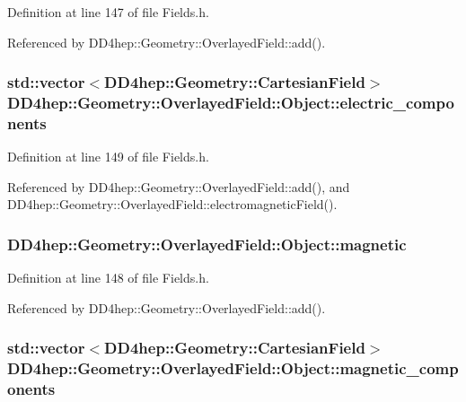Definition at line 147 of file Fields.h.

Referenced by DD4hep::Geometry::OverlayedField::add().\hypertarget{class_d_d4hep_1_1_geometry_1_1_overlayed_field_1_1_object_aae39088c562716b2948e205cebb2c8b4}{
\subsubsection[{electric\_\-components}]{\setlength{\rightskip}{0pt plus 5cm}std::vector$<${\bf DD4hep::Geometry::CartesianField}$>$ {\bf DD4hep::Geometry::OverlayedField::Object::electric\_\-components}}}
\label{class_d_d4hep_1_1_geometry_1_1_overlayed_field_1_1_object_aae39088c562716b2948e205cebb2c8b4}


Definition at line 149 of file Fields.h.

Referenced by DD4hep::Geometry::OverlayedField::add(), and DD4hep::Geometry::OverlayedField::electromagneticField().\hypertarget{class_d_d4hep_1_1_geometry_1_1_overlayed_field_1_1_object_ad7154abfd06456e5530e93b29c2bab40}{
\subsubsection[{magnetic}]{ {\bf DD4hep::Geometry::OverlayedField::Object::magnetic}}}
\label{class_d_d4hep_1_1_geometry_1_1_overlayed_field_1_1_object_ad7154abfd06456e5530e93b29c2bab40}


Definition at line 148 of file Fields.h.

Referenced by DD4hep::Geometry::OverlayedField::add().\hypertarget{class_d_d4hep_1_1_geometry_1_1_overlayed_field_1_1_object_ab56126a85338942dfac10260834e88a4}{
\subsubsection[{magnetic\_\-components}]{\setlength{\rightskip}{0pt plus 5cm}std::vector$<${\bf DD4hep::Geometry::CartesianField}$>$ {\bf DD4hep::Geometry::OverlayedField::Object::magnetic\_\-components}}}
\label{class_d_d4hep_1_1_geometry_1_1_overlayed_field_1_1_object_ab56126a85338942dfac10260834e88a4}


